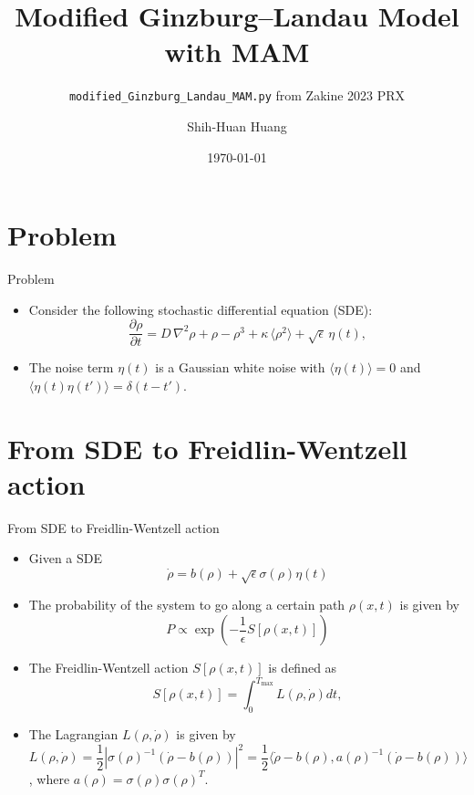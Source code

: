 \documentclass{beamer}
\title{Modified Ginzburg--Landau Model with MAM}
\subtitle{\texttt{modified\_Ginzburg\_Landau\_MAM.py} from Zakine 2023 PRX}
\author{Shih-Huan Huang}
\date{\today}
\begin{document}
\begin{frame}
    \titlepage
\end{frame}

\section{Problem}
\begin{frame}{Problem}
    \begin{itemize}
        \item Consider the following stochastic differential equation (SDE):
        \begin{equation}
            \frac{\partial \rho}{\partial t} = D\,\nabla^2\rho + \rho - \rho^3 + \kappa\,\langle \rho^2 \rangle + \sqrt{\epsilon}\,\eta(t),
        \end{equation}
        \item The noise term $\eta(t)$ is a Gaussian white noise with $\langle \eta(t) \rangle = 0$ and $\langle \eta(t) \eta(t') \rangle = \delta(t - t')$.
    \end{itemize}
\end{frame}

\section{From SDE to Freidlin-Wentzell action}
\begin{frame}{From SDE to Freidlin-Wentzell action}
    \begin{itemize}
        \item Given a SDE 
        \begin{equation}
            \dot{\rho} = b(\rho) + \sqrt{\epsilon}\sigma(\rho)\eta(t)
        \end{equation}
        \item The probability of the system to go along a certain path $\rho(x,t)$ is given by 
        \begin{equation}
            P \propto \exp\left( -\frac{1}{\epsilon} S[\rho(x,t)] \right)
        \end{equation}
        \item The Freidlin-Wentzell action $S[\rho(x,t)]$ is defined as
        \begin{equation}
            S[\rho(x,t)] = \int_0^{T_{\max}} L(\rho, \dot{\rho}) dt,
        \end{equation}
        \item The Lagrangian $L(\rho, \dot{\rho})$ is given by
        \begin{equation}
            L(\rho, \dot{\rho}) = \frac{1}{2} \left| \sigma(\rho)^{-1} (\dot{\rho} - b(\rho)) \right|^2 = \frac{1}{2} \langle \dot{\rho} - b(\rho), a(\rho)^{-1} (\dot{\rho} - b(\rho)) \rangle
        \end{equation}, where $a(\rho) = \sigma(\rho)\sigma(\rho)^T$.
    \end{itemize}
\end{frame}
\end{document}
